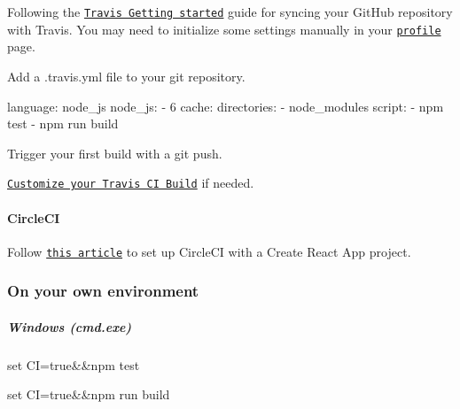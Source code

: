 \begin{DoxyEnumerate}
\item Following the \href{https://docs.travis-ci.com/user/getting-started/}{\tt Travis Getting started} guide for syncing your Git\+Hub repository with Travis. You may need to initialize some settings manually in your \href{https://travis-ci.org/profile}{\tt profile} page.
\end{DoxyEnumerate}
\begin{DoxyEnumerate}
\item Add a {\ttfamily .travis.\+yml} file to your git repository. 
\begin{DoxyCode}
language: node\_js
node\_js:
  - 6
cache:
  directories:
    - node\_modules
script:
  - npm test
  - npm run build
\end{DoxyCode}

\end{DoxyEnumerate}
\begin{DoxyEnumerate}
\item Trigger your first build with a git push.
\end{DoxyEnumerate}
\begin{DoxyEnumerate}
\item \href{https://docs.travis-ci.com/user/customizing-the-build/}{\tt Customize your Travis CI Build} if needed.
\end{DoxyEnumerate}

\paragraph*{Circle\+CI}

Follow \href{https://medium.com/@knowbody/circleci-and-zeits-now-sh-c9b7eebcd3c1}{\tt this article} to set up Circle\+CI with a Create React App project.

\subsubsection*{On your own environment}

\subparagraph*{Windows (cmd.\+exe)}


\begin{DoxyCode}
set CI=true&&npm test
\end{DoxyCode}



\begin{DoxyCode}
set CI=true&&npm run build
\end{DoxyCode}


